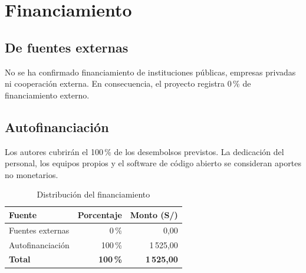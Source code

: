 \section{Financiamiento}

\subsection{De fuentes externas}

No se ha confirmado financiamiento de instituciones públicas, empresas privadas ni cooperación externa. En consecuencia, el proyecto registra 0\,\% de financiamiento externo.

\subsection{Autofinanciación}

Los autores cubrirán el 100\,\% de los desembolsos previstos. La dedicación del personal, los equipos propios y el software de código abierto se consideran aportes no monetarios.

\begin{table}[H]
\centering
\caption{Distribución del financiamiento}
\label{tab:financiamiento}
\begin{tabular}{lrr}
\toprule
\textbf{Fuente} & \textbf{Porcentaje} & \textbf{Monto (S/)} \\
\midrule
Fuentes externas & 0\,\% & 0,00 \\
Autofinanciación & 100\,\% & 1\,525,00 \\
\midrule
\textbf{Total} & \textbf{100\,\%} & \textbf{1\,525,00} \\
\bottomrule
\end{tabular}
\end{table}
